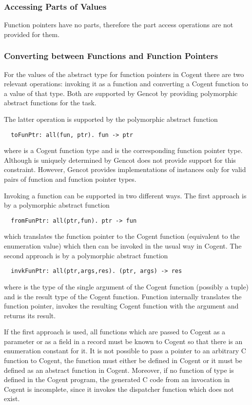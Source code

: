 \subsubsection{Accessing Parts of Values}

Function pointers have no parts, therefore the part access operations are not provided for them.

\subsubsection{Converting between Functions and Function Pointers}

For the values of the abstract type for function pointers in Cogent there are two relevant operations: invoking
it as a function and converting a Cogent function to a value of that type. Both are supported by Gencot
by providing polymorphic abstract functions for the task.

The latter operation is supported by the polymorphic abstract function
\begin{verbatim}
  toFunPtr: all(fun, ptr). fun -> ptr
\end{verbatim}
where  is a Cogent function type and  is the corresponding function pointer type.
Although  is uniquely determined by  Gencot does not provide support for this constraint.
However, Gencot provides implementations of instances only for valid pairs of function and function pointer types.

Invoking a function can be supported in two different ways. The first approach is by a polymorphic
abstract function
\begin{verbatim}
  fromFunPtr: all(ptr,fun). ptr -> fun
\end{verbatim}
which translates the function pointer to the Cogent function (equivalent to the enumeration value) which
then can be invoked in the usual way in Cogent. The second approach is by a polymorphic  abstract function 
\begin{verbatim}
  invkFunPtr: all(ptr,args,res). (ptr, args) -> res
\end{verbatim}
where  is the type of the single argument of the Cogent function (possibly a tuple) and 
is the result type of the Cogent function. Function  internally translates the function pointer,
invokes the resulting Cogent function with the argument and returns its result.

If the first approach is used, all functions which are passed to Cogent as a parameter or as a field in a record must be known to
Cogent so that there is an enumeration constant for it. It is not possible to pass a pointer to an arbitrary 
C function to Cogent, the function must either be defined in Cogent or it must be defined as an abstract function 
in Cogent. Moreover, if no function of type  is defined in the Cogent program, the
generated C code from an invocation in Cogent is incomplete, since it invokes the dispatcher function which does
not exist.

